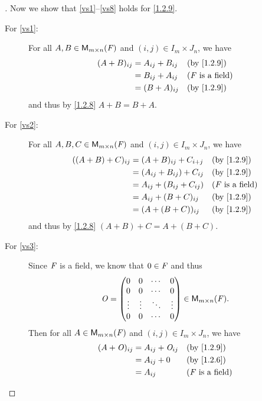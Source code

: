 \begin{proof}[]
	Now we show that \ref{vs1}--\ref{vs8} holds for \cref{1.2.9}.
	\begin{description}
		\item[For \ref{vs1}:]
			For all \(A, B \in \mathsf{M}_{{m} \times n}({\mathit{F}})\) and \((i, j) \in I_m \times J_n\), we have
			\begin{align*}
				(A + B)_{i j} & = A_{i j} + B_{i j} &  & \text{(by \cref{1.2.9})}   \\
				              & = B_{i j} + A_{i j} &  & \text{(\(\F\) is a field)} \\
				              & = (B + A)_{i j}     &  & \text{(by \cref{1.2.9})}
			\end{align*}
			and thus by \cref{1.2.8} \(A + B = B + A\).
		\item[For \ref{vs2}:]
			For all \(A, B, C \in \mathsf{M}_{{m} \times n}({\mathit{F}})\) and \((i, j) \in I_m \times J_n\), we have
			\begin{align*}
				((A + B) + C)_{i j} & = (A + B)_{i j} + C_{i + j}     &  & \text{(by \cref{1.2.9})}   \\
				                    & = (A_{i j} + B_{i j}) + C_{i j} &  & \text{(by \cref{1.2.9})}   \\
				                    & = A_{i j} + (B_{i j} + C_{i j}) &  & \text{(\(\F\) is a field)} \\
				                    & = A_{i j} + (B + C)_{i j}       &  & \text{(by \cref{1.2.9})}   \\
				                    & = (A + (B + C))_{i j}           &  & \text{(by \cref{1.2.9})}
			\end{align*}
			and thus by \cref{1.2.8} \((A + B) + C = A + (B + C)\).
		\item[For \ref{vs3}:]
			Since \(\mathit{F}\) is a field, we know that \(0 \in \mathit{F}\) and thus
			\[
				\mathit{O} = \begin{pmatrix}
					0      & 0      & \cdots & 0      \\
					0      & 0      & \cdots & 0      \\
					\vdots & \vdots & \ddots & \vdots \\
					0      & 0      & \cdots & 0
				\end{pmatrix} \in \mathsf{M}_{{m} \times n}({\mathit{F}}).
			\]
			Then for all \(A \in \mathsf{M}_{{m} \times n}({\mathit{F}})\) and \((i, j) \in I_m \times J_n\), we have
			\begin{align*}
				(A + \zm)_{i j} & = A_{i j} + \zm_{i j} &  & \text{(by \cref{1.2.9})}   \\
				                & = A_{i j} + 0         &  & \text{(by \cref{1.2.6})}   \\
				                & = A_{i j}             &  & \text{(\(\F\) is a field)}

\end{align*}
\end{description}
\end{proof}
